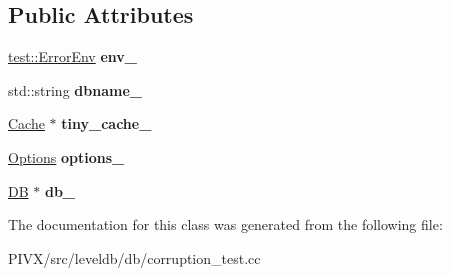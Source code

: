 \subsection*{Public Attributes}
\begin{DoxyCompactItemize}
\item 
\mbox{\label{classleveldb_1_1_corruption_test_a9ea05b88e4240ace348f542b43d59281}} 
\mbox{\hyperlink{classleveldb_1_1test_1_1_error_env}{test\+::\+Error\+Env}} {\bfseries env\+\_\+}
\item 
\mbox{\label{classleveldb_1_1_corruption_test_a533997a5fb977df165da8d92b6e9914a}} 
std\+::string {\bfseries dbname\+\_\+}
\item 
\mbox{\label{classleveldb_1_1_corruption_test_afc8ff2f272ee3da2756acc21c37750d5}} 
\mbox{\hyperlink{classleveldb_1_1_cache}{Cache}} $\ast$ {\bfseries tiny\+\_\+cache\+\_\+}
\item 
\mbox{\label{classleveldb_1_1_corruption_test_a6d639ef3ec7f1009447b85f9a10f90ac}} 
\mbox{\hyperlink{structleveldb_1_1_options}{Options}} {\bfseries options\+\_\+}
\item 
\mbox{\label{classleveldb_1_1_corruption_test_a8bfd06bc0008cddb00e9492648bfca79}} 
\mbox{\hyperlink{classleveldb_1_1_d_b}{DB}} $\ast$ {\bfseries db\+\_\+}
\end{DoxyCompactItemize}


The documentation for this class was generated from the following file\+:\begin{DoxyCompactItemize}
\item 
P\+I\+V\+X/src/leveldb/db/corruption\+\_\+test.\+cc\end{DoxyCompactItemize}
